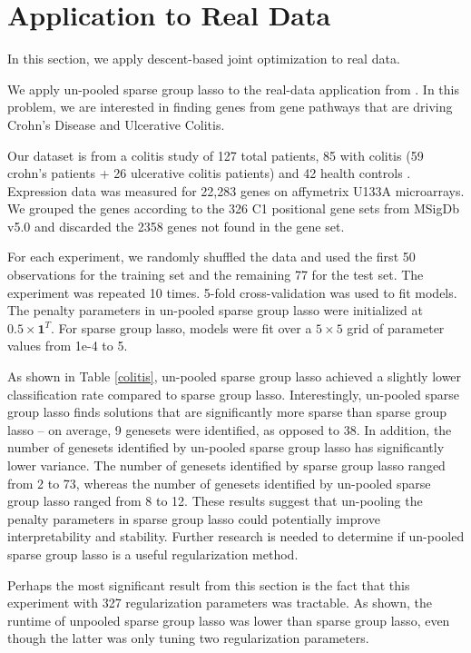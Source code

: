 \documentclass[10pt,letterpaper]{article}
\begin{document}
\section{Application to Real Data}
In this section, we apply descent-based joint optimization to real data.

We apply un-pooled sparse group lasso to the real-data application from \citet{simon2013sparse}. In this problem, we are interested in finding genes from gene pathways that are driving Crohn's Disease and Ulcerative Colitis.

Our dataset is from a colitis study of 127 total patients, 85 with colitis (59 crohn's patients + 26 ulcerative colitis patients) and 42 health controls \citep{burczynski2006molecular}. Expression data was measured for 22,283 genes on affymetrix U133A microarrays. We grouped the genes according to the 326 C1 positional gene sets from MSigDb v5.0 \citep{subramanian2005gene} and discarded the 2358 genes not found in the gene set.

For each experiment, we randomly shuffled the data and used the first 50 observations for the training set and the remaining 77 for the test set. The experiment was repeated 10 times. 5-fold cross-validation was used to fit models. The penalty parameters in un-pooled sparse group lasso were initialized at $0.5 \times \boldsymbol 1^T$. For sparse group lasso, models were fit over a $5 \times 5$ grid of parameter values from 1e-4 to 5.

As shown in Table \ref{colitis}, un-pooled sparse group lasso achieved a slightly lower classification rate compared to sparse group lasso. Interestingly, un-pooled sparse group lasso finds solutions that are significantly more sparse than sparse group lasso -- on average, 9 genesets were identified, as opposed to 38. In addition, the number of genesets identified by un-pooled sparse group lasso has significantly lower variance. The number of genesets identified by sparse group lasso ranged from 2 to 73, whereas the number of genesets identified by un-pooled sparse group lasso ranged from 8 to 12. These results suggest that un-pooling the penalty parameters in sparse group lasso could potentially improve interpretability and stability. Further research is needed to determine if un-pooled sparse group lasso is a useful regularization method.

Perhaps the most significant result from this section is the fact that this experiment with 327 regularization parameters was tractable. As shown, the runtime of unpooled sparse group lasso was lower than sparse group lasso, even though the latter was only tuning two regularization parameters.
\end{document}
